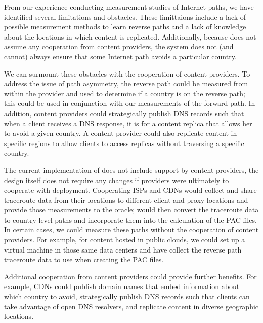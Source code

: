 From our experience conducting measurement studies of Internet paths, we have
identified several limitations and obstacles.  These limittaions include a lack
of possible measurement methods to
learn reverse paths and a lack of knowledge about the locations in which
content is replicated. Additionally, because \system{} does not assume any
cooperation from content providers, the system does not (and cannot) always
ensure that some Internet path avoids a particular country.

We can surmount these obstacles with the cooperation of content providers. To
address the issue of path asymmetry, the reverse path could be measured from
within the provider and used to determine if a country is on the reverse path;
this could be used in conjunction with our measurements  of the forward path.
In addition, content providers could strategically publish DNS records such
that when a client receives a DNS response, it is for a content replica that
allows her to avoid a given country.  A content provider could also  replicate
content in specific regions to allow clients to access replicas without
traversing a specific  country.

The current implementation of \system{} does not include support by content
providers, the design itself does not require any changes if providers were
ultimately to cooperate with deployment. Cooperating ISPs and CDNs would
collect and share traceroute data from their locations to different client and
proxy locations and provide those measurements to the \system{} oracle;
\system{} would then convert the traceroute data to country-level paths and
incorporate them into the calculation of the  PAC files.  In certain cases, we
could measure these paths without the cooperation of content providers. For
example, for content hosted in public clouds, we could set up a virtual
machine in those same data centers and have  \system{} collect the reverse
path traceroute data to use when creating the PAC files.

Additional cooperation from content providers could provide further benefits.
For example, CDNs could publish domain names that embed information about
which country to avoid, strategically publish DNS records such  that clients
can take advantage of open DNS resolvers, and replicate content in diverse
geographic locations.

%
